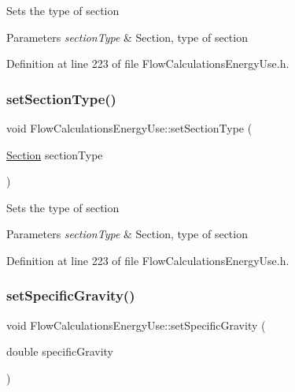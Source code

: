 Sets the type of section


\begin{DoxyParams}{Parameters}
{\em section\+Type} & Section, type of section \\
\hline
\end{DoxyParams}


Definition at line 223 of file Flow\+Calculations\+Energy\+Use.\+h.

\mbox{\label{class_flow_calculations_energy_use_add93257048914dbd920b6dc2be431b69}} 
\subsubsection{\texorpdfstring{set\+Section\+Type()}{setSectionType()}\hspace{0.1cm}{\footnotesize\ttfamily [3/3]}}
{\footnotesize\ttfamily void Flow\+Calculations\+Energy\+Use\+::set\+Section\+Type (\begin{DoxyParamCaption}\item[{\hyperlink{class_flow_calculations_energy_use_afbabab0da698748de91369a5dfc7662a}{Section}}]{section\+Type }\end{DoxyParamCaption})\hspace{0.3cm}{\ttfamily [inline]}}

Sets the type of section


\begin{DoxyParams}{Parameters}
{\em section\+Type} & Section, type of section \\
\hline
\end{DoxyParams}


Definition at line 223 of file Flow\+Calculations\+Energy\+Use.\+h.

\mbox{\label{class_flow_calculations_energy_use_abafa34d337124a1487fb0c871ea8a24a}} 
\subsubsection{\texorpdfstring{set\+Specific\+Gravity()}{setSpecificGravity()}\hspace{0.1cm}{\footnotesize\ttfamily [1/3]}}
{\footnotesize\ttfamily void Flow\+Calculations\+Energy\+Use\+::set\+Specific\+Gravity (\begin{DoxyParamCaption}\item[{double}]{specific\+Gravity }\end{DoxyParamCaption})\hspace{0.3cm}{\ttfamily [inline]}}

